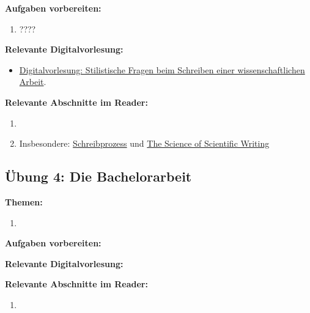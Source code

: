 \documentclass[a4paper]{article}%
\begin{document}
\textbf{Aufgaben vorbereiten:}
\begin{enumerate}
\item ????
\end{enumerate}


\bigskip


\textbf{Relevante Digitalvorlesung:}
\begin{itemize}
\item \hyperlink{Digitalvorlesung}{Digitalvorlesung: Stilistische Fragen beim Schreiben einer wissenschaftlichen Arbeit}.
\end{itemize}

\bigskip

\textbf{Relevante Abschnitte im Reader:}
\begin{enumerate}
\item {}
\item Insbesondere:
\hyperlink{Schreibprozess}{Schreibprozess}
und \hyperlink{The Science of Scientific Writing}{The Science of Scientific Writing}
\end{enumerate}


\clearpage
\subsection{Übung 4: Die Bachelorarbeit}

\textbf{Themen:}
\begin{enumerate}
\item {}
\end{enumerate}

\bigskip


\textbf{Aufgaben vorbereiten:}

\bigskip

\textbf{Relevante Digitalvorlesung:}

\bigskip

\textbf{Relevante Abschnitte im Reader:}
\begin{enumerate}
\item {}
\end{enumerate}
\end{document}
